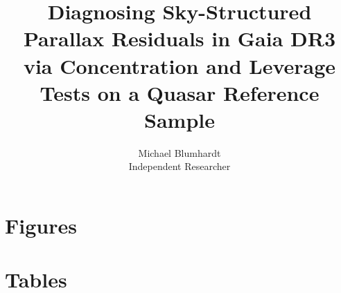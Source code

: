 \documentclass[11pt]{article}
\title{\bfseries Diagnosing Sky-Structured Parallax Residuals in Gaia DR3\\
via Concentration and Leverage Tests on a Quasar Reference Sample}
\author{Michael Blumhardt\\\small Independent Researcher}
\date{}
\begin{document}
\maketitle

\begin{abstract}

\end{abstract}







\clearpage

\section*{Figures}


\section*{Tables}


% 
% 


\clearpage


\end{document}
